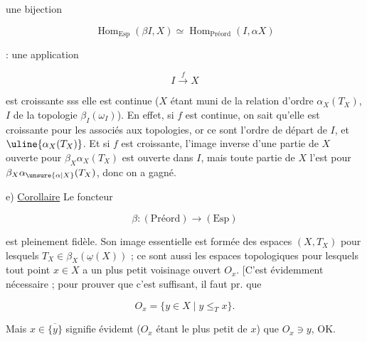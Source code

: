 une bijection

\[
\operatorname{Hom}_{\mathrm{Esp}}(\beta I,X)\simeq\operatorname{Hom}_{\mathrm{Préord}}(I,\alpha X)\tag*{$(*)$}
\]


: une application

\[
I\xrightarrow{f}X
\]

est croissante sss elle est continue (\unsure{$[$}$X$ étant muni de la
relation d'ordre $\alpha_X(T_X)$, $I$ de la topologie $\beta_I(\omega_I)$).
En effet, si $f$ est continue, on sait qu'elle est croissante pour les
 associés aux topologies, or ce sont l'ordre de départ de $I$, et $\uline{\alpha_X(T_X)}$.
Et si $f$ est croissante,  l'image inverse d'une partie de $X$
ouverte pour $\beta_X\alpha_X(T_X)$ est ouverte dans $I$, mais toute partie
 de $X$  l'est pour $\beta_X\alpha_{\unsure{\alpha|X}}(T_X)$, donc on a gagné.

e) \uline{Corollaire} Le foncteur

\[
\beta:(\mathrm{Préord})\longrightarrow(\mathrm{Esp})
\]

est pleinement fidèle. Son image essentielle est formée des
espaces $(X,T_X)$ pour lesquels $T_X\in\beta_X(\underline\omega(X))$ ; ce sont aussi
les espaces topologiques pour lesquels tout point $x\in X$ a un
plus petit voisinage ouvert $O_x$. [C'est évidemment nécessaire ;
 pour prouver que c'est suffisant, il faut pr. que

\[
O_x=\{y\in X\mid y\leq_T x\}.
\]

Mais  
$x\in\overline{\{y\}}$ signifie évidemt ($O_x$ étant le plus petit  de $x$)
que $O_x\ni y$, OK.



